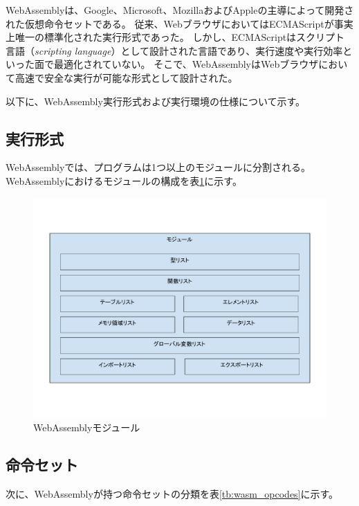 WebAssemblyは、Google、Microsoft、MozillaおよびAppleの主導によって開発された仮想命令セットである\cite{webassembly}。
従来、WebブラウザにおいてはECMAScriptが事実上唯一の標準化された実行形式であった。
しかし、ECMAScriptはスクリプト言語（{\it scripting language}）として設計された言語であり\cite{ecma2018}、実行速度や実行効率といった面で最適化されていない。
そこで、WebAssemblyはWebブラウザにおいて高速で安全な実行が可能な形式として設計された。

以下に、WebAssembly実行形式および実行環境の仕様について示す。

\subsection{実行形式}

WebAssemblyでは、プログラムは1つ以上のモジュールに分割される。
WebAssemblyにおけるモジュールの構成を表\ref{fig:wasm_module}に示す。

\begin{figure}[htbp]
  \caption{WebAssemblyモジュール}
  \label{fig:wasm_module}
  \begin{center}
    \includegraphics[bb=0 0 800 600,width=12cm]{img/wasm_module.pdf}
  \end{center}
\end{figure}

\subsection{命令セット}

次に、WebAssemblyが持つ命令セットの分類を表\ref{tb:wasm_opcodes}に示す。

